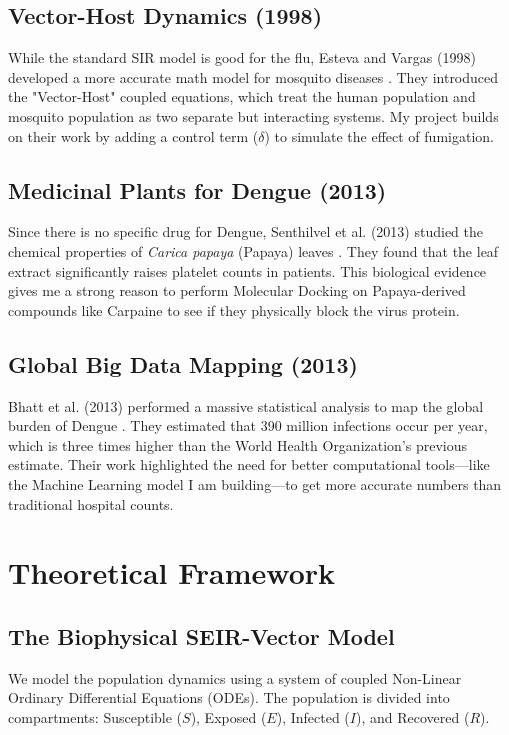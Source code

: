 \documentclass[12pt, a4paper]{article}
\begin{document}
\subsection{Vector-Host Dynamics (1998)}
While the standard SIR model is good for the flu, Esteva and Vargas (1998) developed a more accurate math model for mosquito diseases \cite{ref10}. They introduced the "Vector-Host" coupled equations, which treat the human population and mosquito population as two separate but interacting systems. My project builds on their work by adding a control term ($\delta$) to simulate the effect of fumigation.

\subsection{Medicinal Plants for Dengue (2013)}
Since there is no specific drug for Dengue, Senthilvel et al. (2013) studied the chemical properties of \textit{Carica papaya} (Papaya) leaves \cite{ref11}. They found that the leaf extract significantly raises platelet counts in patients. This biological evidence gives me a strong reason to perform Molecular Docking on Papaya-derived compounds like Carpaine to see if they physically block the virus protein.

\subsection{Global Big Data Mapping (2013)}
Bhatt et al. (2013) performed a massive statistical analysis to map the global burden of Dengue \cite{ref12}. They estimated that 390 million infections occur per year, which is three times higher than the World Health Organization's previous estimate. Their work highlighted the need for better computational tools—like the Machine Learning model I am building—to get more accurate numbers than traditional hospital counts.

\newpage

\section{Theoretical Framework}

\subsection{The Biophysical SEIR-Vector Model}
We model the population dynamics using a system of coupled Non-Linear Ordinary Differential Equations (ODEs). The population is divided into compartments: Susceptible ($S$), Exposed ($E$), Infected ($I$), and Recovered ($R$).
\end{document}
